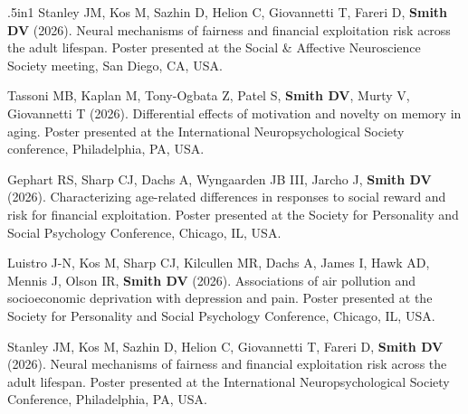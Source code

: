 \documentclass[11pt, letterpaper]{article}
\begin{document}
\begin{hangparas}{.5in}{1}
Stanley JM, Kos M, Sazhin D, Helion C, Giovannetti T, Fareri D, \textbf{Smith DV} (2026). Neural mechanisms of fairness and financial exploitation risk across the adult lifespan. Poster presented at the Social \& Affective Neuroscience Society meeting, San Diego, CA, USA.

Tassoni MB, Kaplan M, Tony-Ogbata Z, Patel S, \textbf{Smith DV}, Murty V, Giovannetti T (2026). Differential effects of motivation and novelty on memory in aging. Poster presented at the International Neuropsychological Society conference, Philadelphia, PA, USA.

Gephart RS, Sharp CJ, Dachs A, Wyngaarden JB III, Jarcho J, \textbf{Smith DV} (2026). Characterizing age-related differences in responses to social reward and risk for financial exploitation. Poster presented at the Society for Personality and Social Psychology Conference, Chicago, IL, USA.

Luistro J-N, Kos M, Sharp CJ, Kilcullen MR, Dachs A, James I, Hawk AD, Mennis J, Olson IR, \textbf{Smith DV} (2026). Associations of air pollution and socioeconomic deprivation with depression and pain. Poster presented at the Society for Personality and Social Psychology Conference, Chicago, IL, USA.

Stanley JM, Kos M, Sazhin D, Helion C, Giovannetti T, Fareri D, \textbf{Smith DV} (2026). Neural mechanisms of fairness and financial exploitation risk across the adult lifespan. Poster presented at the International Neuropsychological Society Conference, Philadelphia, PA, USA. \\

\end{hangparas}
\end{document}
